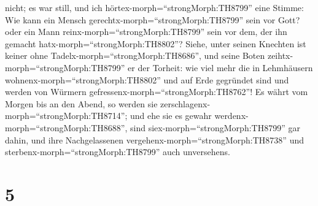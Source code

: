 nicht; es war still, und ich hörtex-morph=``strongMorph:TH8799'' eine
Stimme:  Wie kann ein Mensch
gerechtx-morph=``strongMorph:TH8799'' sein vor Gott? oder ein Mann
reinx-morph=``strongMorph:TH8799'' sein vor dem, der ihn gemacht
hatx-morph=``strongMorph:TH8802''?  Siehe, unter seinen
Knechten ist keiner ohne Tadelx-morph=``strongMorph:TH8686'', und seine
Boten zeihtx-morph=``strongMorph:TH8799'' er der Torheit: 
wie viel mehr die in Lehmhäusern wohnenx-morph=``strongMorph:TH8802''
und auf Erde gegründet sind und werden von Würmern
gefressenx-morph=``strongMorph:TH8762''!  Es währt vom
Morgen bis an den Abend, so werden sie
zerschlagenx-morph=``strongMorph:TH8714''; und ehe sie es gewahr
werdenx-morph=``strongMorph:TH8688'', sind
siex-morph=``strongMorph:TH8799'' gar dahin,  und ihre
Nachgelassenen vergehenx-morph=``strongMorph:TH8738'' und
sterbenx-morph=``strongMorph:TH8799'' auch unversehens.

\hypertarget{section-4}{%
\section{5}\label{section-4}}

